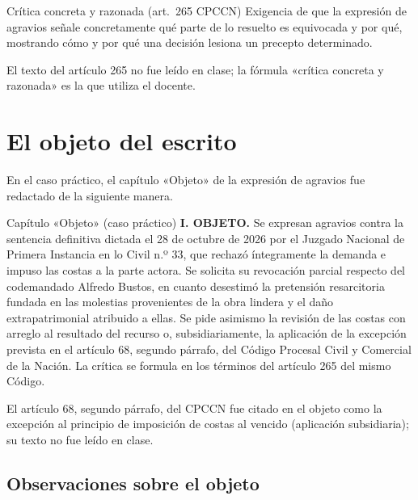 \documentclass[12pt,oneside]{book}
\begin{document}
\begin{definition}{Crítica concreta y razonada (art.~265 CPCCN)}
Exigencia de que la expresión de agravios señale concretamente qué parte de lo resuelto es equivocada y por qué, mostrando cómo y por qué una decisión lesiona un precepto determinado.
\end{definition}

\begin{note}
El texto del artículo 265 no fue leído en clase; la fórmula «crítica concreta y razonada» es la que utiliza el docente.
\end{note}

\section{El objeto del escrito}

En el caso práctico, el capítulo «Objeto» de la expresión de agravios fue redactado de la siguiente manera.

\begin{example}{Capítulo «Objeto» (caso práctico)}
\textbf{I. OBJETO.} Se expresan agravios contra la sentencia definitiva dictada el 28 de octubre de 2026 por el Juzgado Nacional de Primera Instancia en lo Civil n.º 33, que rechazó íntegramente la demanda e impuso las costas a la parte actora. Se solicita su revocación parcial respecto del codemandado Alfredo Bustos, en cuanto desestimó la pretensión resarcitoria fundada en las molestias provenientes de la obra lindera y el daño extrapatrimonial atribuido a ellas. Se pide asimismo la revisión de las costas con arreglo al resultado del recurso o, subsidiariamente, la aplicación de la excepción prevista en el artículo 68, segundo párrafo, del Código Procesal Civil y Comercial de la Nación. La crítica se formula en los términos del artículo 265 del mismo Código.
\end{example}

El artículo 68, segundo párrafo, del CPCCN fue citado en el objeto como la excepción al principio de imposición de costas al vencido (aplicación subsidiaria); su texto no fue leído en clase.

\subsection{Observaciones sobre el objeto}
\end{document}
